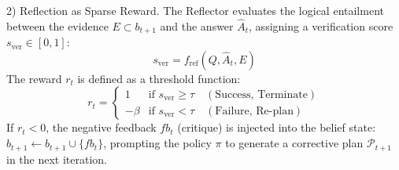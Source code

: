\documentclass[11pt]{article}
\begin{document}
2) Reflection as Sparse Reward.
The Reflector evaluates the logical entailment between the evidence $E \subset b_{t+1}$ and the answer $\hat{A}_t$, assigning a verification score $s_{\text{ver}} \in [0, 1]$:
\begin{equation}
    s_{\text{ver}} = f_{\text{ref}}(Q, \hat{A}_t, E)
\end{equation}
The reward $r_t$ is defined as a threshold function:
\begin{equation}
    r_t = \begin{cases} 
    1 & \text{if } s_{\text{ver}} \ge \tau \quad (\text{Success, Terminate}) \\
    -\beta & \text{if } s_{\text{ver}} < \tau \quad (\text{Failure, Re-plan})
    \end{cases}
\end{equation}
If $r_t < 0$, the negative feedback $fb_t$ (critique) is injected into the belief state: $b_{t+1} \leftarrow b_{t+1} \cup \{fb_t\}$, prompting the policy $\pi$ to generate a corrective plan $\mathcal{P}_{t+1}$ in the next iteration.
\end{document}
